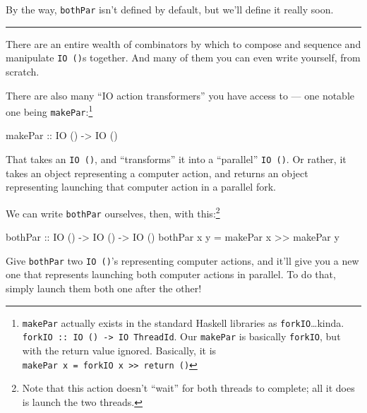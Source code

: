 \documentclass[]{article}
\newenvironment{Shaded}{}{}
\newcommand{\DataTypeTok}[1]{\textcolor[rgb]{0.56,0.13,0.00}{{#1}}}
\newcommand{\OtherTok}[1]{\textcolor[rgb]{0.00,0.44,0.13}{{#1}}}
\newcommand{\FunctionTok}[1]{\textcolor[rgb]{0.02,0.16,0.49}{{#1}}}
\newcommand{\NormalTok}[1]{{#1}}
\begin{document}
By the way, \texttt{bothPar} isn't defined by default, but we'll define
it really soon.

\begin{center}\rule{0.5\linewidth}{\linethickness}\end{center}

There are an entire wealth of combinators by which to compose and
sequence and manipulate \texttt{IO\ ()}s together. And many of them you
can even write yourself, from scratch.

There are also many ``IO action transformers'' you have access to ---
one notable one being \texttt{makePar}:\footnote{\texttt{makePar}
  actually exists in the standard Haskell libraries as
  \texttt{forkIO}\ldots{}kinda.
  \texttt{forkIO\ ::\ IO\ ()\ -\textgreater{}\ IO\ ThreadId}. Our
  \texttt{makePar} is basically \texttt{forkIO}, but with the return
  value ignored. Basically, it is
  \texttt{makePar\ x\ =\ forkIO\ x\ \textgreater{}\textgreater{}\ return\ ()}}

\begin{Shaded}
\begin{Highlighting}[]
\OtherTok{makePar ::} \DataTypeTok{IO} \NormalTok{() }\OtherTok{->} \DataTypeTok{IO} \NormalTok{()}
\end{Highlighting}
\end{Shaded}

That takes an \texttt{IO\ ()}, and ``transforms'' it into a ``parallel''
\texttt{IO\ ()}. Or rather, it takes an object representing a computer
action, and returns an object representing launching that computer
action in a parallel fork.

We can write \texttt{bothPar} ourselves, then, with this:\footnote{Note
  that this action doesn't ``wait'' for both threads to complete; all it
  does is launch the two threads.}

\begin{Shaded}
\begin{Highlighting}[]
\OtherTok{bothPar ::} \DataTypeTok{IO} \NormalTok{() }\OtherTok{->} \DataTypeTok{IO} \NormalTok{() }\OtherTok{->} \DataTypeTok{IO} \NormalTok{()}
\NormalTok{bothPar x y }\FunctionTok{=} \NormalTok{makePar x }\FunctionTok{>>} \NormalTok{makePar y}
\end{Highlighting}
\end{Shaded}

Give \texttt{bothPar} two \texttt{IO\ ()}'s representing computer
actions, and it'll give you a new one that represents launching both
computer actions in parallel. To do that, simply launch them both one
after the other!
\end{document}
